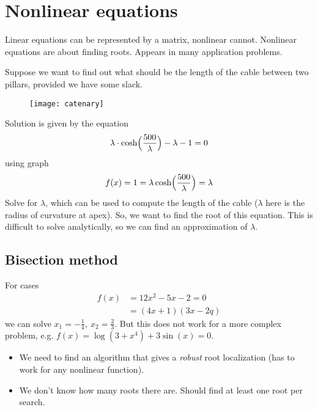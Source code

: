 \pagebreak
\section{Nonlinear equations}
Linear equations can be represented by a matrix, nonlinear cannot.
Nonlinear equations are about finding roots. Appears in many application problems.

\begin{example}
    Suppose we want to find out what should be the length
    of the cable between two pillars, provided we have some slack.
    \begin{figure*}[h]
        \centering
        \texttt{[image: catenary]}
    \end{figure*}
    Solution is given by the equation
    \[
        \lambda \cdot \cosh\Bigl(\frac{500}{\lambda}\Bigr) - \lambda - 1 = 0
    \]
    using graph
    \[ f(x) = 1 = \lambda \cosh\Bigl(\frac{500}{\lambda}\Bigr) = \lambda \]
    Solve for $\lambda$, which can be used to compute the length of the cable
    ($\lambda$ here is the radius of curvature at apex).
    So, we want to find the root of this equation.
    This is difficult to solve analytically, so we can find 
    an approximation of $\lambda$.
\end{example}

\subsection{Bisection method}
For cases 
\begin{align*}
    f(x) &= 12 x^2 - 5x - 2 = 0\\
    &=(4x + 1)(3x - 2q)
\end{align*}
we can solve $x_1 = -\frac{1}{4},\ x_2 = \frac{2}{3}$.
But this does not work for a more complex problem, e.g.
$f(x) = \log(3 + x^4) + 3\sin(x) = 0$.

\begin{itemize}
    \item {
        We need to find an algorithm that gives a \textit{robust}
        root localization (has to work for any nonlinear function).
    }
    \item {
        We don't know how many roots there are. Should find at least one root per search.
    }
\end{itemize}

